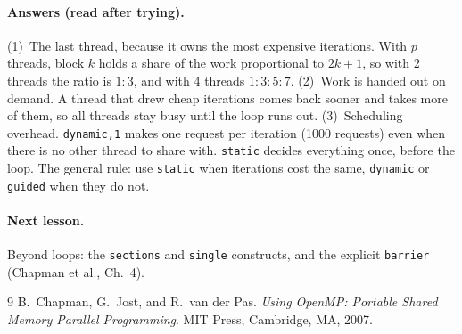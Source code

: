 \documentclass[11pt,a4paper]{article}
\begin{document}
\paragraph{Answers (read after trying).}
(1)~The last thread, because it owns the most expensive iterations. With $p$ threads,
block $k$ holds a share of the work proportional to $2k+1$, so with 2 threads the ratio is
$1:3$, and with 4 threads $1:3:5:7$.
(2)~Work is handed out on demand. A thread that drew cheap iterations comes back sooner and
takes more of them, so all threads stay busy until the loop runs out.
(3)~Scheduling overhead. \texttt{dynamic,1} makes one request per iteration (1000
requests) even when there is no other thread to share with. \texttt{static} decides
everything once, before the loop. The general rule: use \texttt{static} when iterations cost
the same, \texttt{dynamic} or \texttt{guided} when they do not.

\paragraph{Next lesson.} Beyond loops: the \texttt{sections} and \texttt{single}
constructs, and the explicit \texttt{barrier} (Chapman et al., Ch.~4).

\begin{thebibliography}{9}
 B.~Chapman, G.~Jost, and R.~van der Pas. \emph{Using OpenMP: Portable
  Shared Memory Parallel Programming}. MIT Press, Cambridge, MA, 2007.
\end{thebibliography}
\end{document}
